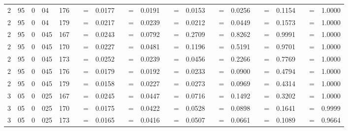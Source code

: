 \begin{tabular*}{260mm}{r@{.}lr@{.}lc|ccc:ccc:ccc:ccc:ccc|ccc}
		2&95	&	0&04	&	176	&	 &=& 0.0177 & 	 &=& 0.0191 & 	 &=& 0.0153 & 	 &=& 0.0256 & 	 &=& 0.1154 & 	 &=& 1.0000 \\ 
		2&95	&	0&04	&	179	&	 &=& 0.0217 & 	 &=& 0.0239 & 	 &=& 0.0212 & 	 &=& 0.0449 & 	 &=& 0.1573 & 	 &=& 1.0000 \\ 
		2&95	&	0&045	&	167	&	 &=& 0.0243 & 	 &=& 0.0792 & 	 &=& 0.2709 & 	 &=& 0.8262 & 	 &=& 0.9991 & 	 &=& 1.0000 \\ 
		2&95	&	0&045	&	170	&	 &=& 0.0227 & 	 &=& 0.0481 & 	 &=& 0.1196 & 	 &=& 0.5191 & 	 &=& 0.9701 & 	 &=& 1.0000 \\ 
		2&95	&	0&045	&	173	&	 &=& 0.0252 & 	 &=& 0.0239 & 	 &=& 0.0456 & 	 &=& 0.2266 & 	 &=& 0.7769 & 	 &=& 1.0000 \\ 
		2&95	&	0&045	&	176	&	 &=& 0.0179 & 	 &=& 0.0192 & 	 &=& 0.0233 & 	 &=& 0.0900 & 	 &=& 0.4794 & 	 &=& 1.0000 \\ 
		2&95	&	0&045	&	179	&	 &=& 0.0158 & 	 &=& 0.0227 & 	 &=& 0.0273 & 	 &=& 0.0969 & 	 &=& 0.4314 & 	 &=& 1.0000 \\ 
		3&05	&	0&025	&	167	&	 &=& 0.0245 & 	 &=& 0.0447 & 	 &=& 0.0716 & 	 &=& 0.1492 & 	 &=& 0.3202 & 	 &=& 1.0000 \\ 
		3&05	&	0&025	&	170	&	 &=& 0.0175 & 	 &=& 0.0422 & 	 &=& 0.0528 & 	 &=& 0.0898 & 	 &=& 0.1641 & 	 &=& 0.9999 \\ 
		3&05	&	0&025	&	173	&	 &=& 0.0165 & 	 &=& 0.0416 & 	 &=& 0.0507 & 	 &=& 0.0661 & 	 &=& 0.1089 & 	 &=& 0.9664 \\ 

\end{tabular*}

